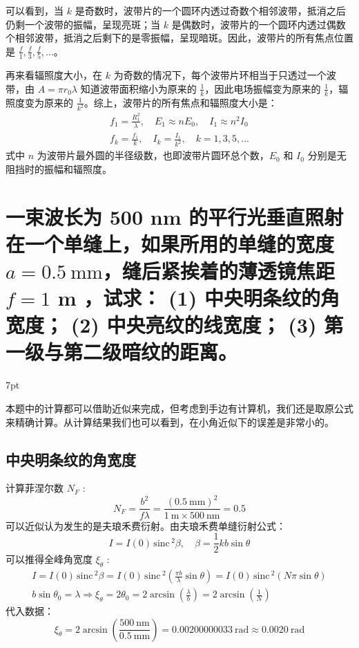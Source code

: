 \documentclass[UTF8]{report}
\def\sinc{\mathrm{\,sinc}\,}
\theoremstyle{MyLineTheoremStyle} %
\theoremstyle{MyBlockTheoremStyle} %
\theoremstyle{MySubsubsectionStyle} %
\newenvironment{graybox}{%
        \def\FrameCommand{%
        \hspace{1pt}%
        {\color{gray}\small \vrule width 2pt}%
        {\color{graybox_color}\vrule width 4pt}%
        \colorbox{graybox_color}%
        }%
        \MakeFramed{\advance\hsize-\width\FrameRestore}%
        \noindent\hspace{-4.55pt}%
        \begin{adjustwidth}{}{7pt}%
        \vspace{2pt}\vspace{2pt}%
        }
        {%
        \vspace{2pt}\end{adjustwidth}\endMakeFramed%
        }
\begin{document}
可以看到，当 $k$ 是奇数时，波带片的一个圆环内透过奇数个相邻波带，抵消之后仍剩一个波带的振幅，呈现亮斑；当 $k$ 是偶数时，波带片的一个圆环内透过偶数个相邻波带，抵消之后剩下的是零振幅，呈现暗斑。因此，波带片的所有焦点位置是 $\frac{f}{1}, \frac{f}{3}, \frac{f}{5}, ...$。

再来看辐照度大小，在 $k$ 为奇数的情况下，每个波带片环相当于只透过一个波带，由 $A = \pi r_0 \lambda$ 知道波带面积缩小为原来的 $\frac{1}{k}$，因此电场振幅变为原来的 $\frac{1}{k}$，辐照度变为原来的 $\frac{1}{k^2}$。综上，波带片的所有焦点和辐照度大小是：
\begin{gather}
f_1 = \frac{R_1^2}{\lambda},\quad   E_1 \approx n E_0 ,\quad   I_1 \approx n^2 I_0 \\
f_k = \frac{f_1}{k},\quad I_k = \frac{I_1}{k^2},\quad k = 1, 3, 5, ...
\end{gather}
式中 $n$ 为波带片最外圆的半径级数，也即波带片圆环总个数，$E_0$ 和 $I_0$ 分别是无阻挡时的振幅和辐照度。

\section{一束波长为 500 nm 的平行光垂直照射在一个单缝上，如果所用的单缝的宽度 $a=0.5 \ \mathrm{mm}$，缝后紧挨着的薄透镜焦距 $f=1$ m ，试求： (1) 中央明条纹的角宽度； (2) 中央亮纹的线宽度； (3) 第一级与第二级暗纹的距离。}

\begin{graybox}
本题中的计算都可以借助近似来完成，但考虑到手边有计算机，我们还是取原公式来精确计算。从计算结果我们也可以看到，在小角近似下的误差是非常小的。
\end{graybox}

\subsection{中央明条纹的角宽度}

计算菲涅尔数 $N_F$ : 
\begin{equation}
N_F = \frac{b^2}{f \lambda} = \frac{(0.5 \ \mathrm{mm})^2}{1 \ \mathrm{m} \times 500 \ \mathrm{nm}} = 0.5
\end{equation}
可以近似认为发生的是夫琅禾费衍射。由夫琅禾费单缝衍射公式：
\begin{equation}
I = I(0) \sinc^2 \beta,\quad \beta = \frac{1}{2}kb \sin \theta
\end{equation}
可以推得全峰角宽度 $\xi_\theta$ : 
\begin{gather}
    I = I(0) \sinc^2 \beta =  I(0) \sinc^2\left( \frac{\pi b}{\lambda} \sin \theta \right) = I(0) \sinc^2\left( N \pi \sin \theta \right) \\ 
    b \sin \theta_0 = \lambda \Longrightarrow \xi_{\theta} = 2 \theta_0 = 2 \arcsin \left(\frac{\lambda}{b}\right) = 2 \arcsin \left(\frac{1}{N}\right)
\end{gather}
代入数据：
\begin{equation}
    \xi_\theta = 2 \arcsin \left( \frac{500 \ \mathrm{nm}}{ 0.5 \ \mathrm{mm} } \right) = 0.00200000033 \ \mathrm{rad} \approx 0.0020 \ \mathrm{rad}
\end{equation}
\end{document}
